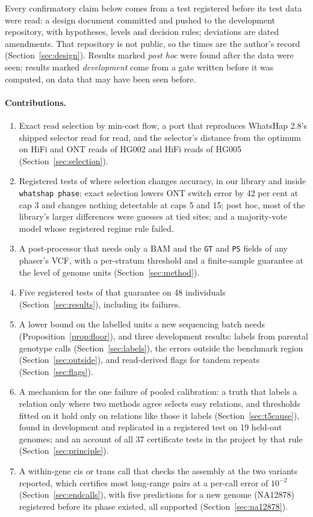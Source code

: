 \documentclass[11pt]{article}
\theoremstyle{definition}
\theoremstyle{remark}
\begin{document}
Every confirmatory claim below comes from a test registered before its test
data were read: a design document committed and pushed to the development
repository, with hypotheses, levels and decision rules; deviations are dated
amendments. That repository is not public, so the times are the author's
record (Section~\ref{sec:design}). Results marked \emph{post hoc} were found after the data were
seen; results marked \emph{development} come from a gate written before it
was computed, on data that may have been seen before.

\paragraph{Contributions.}
\begin{enumerate}
\item Exact read selection by min-cost flow, a port that reproduces
  WhatsHap 2.8's shipped selector read for read, and the selector's distance
  from the optimum on HiFi and ONT reads of HG002 and HiFi reads of HG005
  (Section~\ref{sec:selection}).
\item Registered tests of where selection changes accuracy, in our library
  and inside \texttt{whatshap phase}: exact selection lowers ONT switch error
  by 42 per cent at cap 3 and changes nothing detectable at caps 5 and 15;
  post hoc, most of the library's larger differences were guesses at tied
  sites; and a majority-vote model whose registered regime rule failed.
\item A post-processor that needs only a BAM and the \texttt{GT} and
  \texttt{PS} fields of any phaser's VCF, with a per-stratum threshold and a
  finite-sample guarantee at the level of genome units
  (Section~\ref{sec:method}).
\item Five registered tests of that guarantee on 48 individuals
  (Section~\ref{sec:results}), including its failures.
\item A lower bound on the labelled units a new sequencing batch needs
  (Proposition~\ref{prop:floor}), and three development results: labels from
  parental genotype calls (Section~\ref{sec:labels}), the errors outside the
  benchmark region (Section~\ref{sec:outside}), and read-derived flags for
  tandem repeats (Section~\ref{sec:flags}).
\item A mechanism for the one failure of pooled calibration: a truth that
  labels a relation only where two methods agree selects easy relations, and
  thresholds fitted on it hold only on relations like those it labels
  (Section~\ref{sec:t5cause}), found in development and replicated in a
  registered test on 19 held-out genomes; and an account of all 37 certificate tests in
  the project by that rule (Section~\ref{sec:principle}).
\item A within-gene cis or trans call that checks the assembly at the two
  variants reported, which certifies most long-range pairs at a per-call
  error of $10^{-2}$ (Section~\ref{sec:endcalls}), with five predictions
  for a new genome (NA12878) registered before its phase existed, all
  supported (Section~\ref{sec:na12878}).
\end{enumerate}
\end{document}
